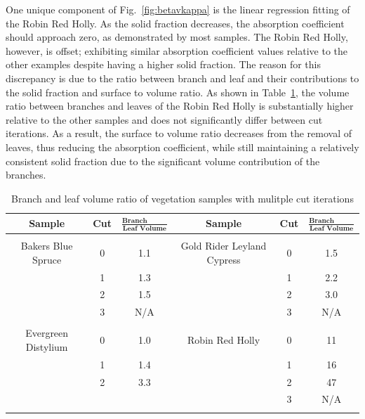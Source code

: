 \documentclass[12pt]{article}
\newcommand*\textfrac[2]{
  \frac{\textbf{#1}}{\textbf{#2}}
}
\begin{document}
One unique component of Fig.~\ref{fig:betavkappa} is the linear regression fitting of the Robin Red Holly. As the solid fraction decreases, the absorption coefficient should approach zero, as demonstrated by most samples. The Robin Red Holly, however, is offset; exhibiting similar absorption coefficient values relative to the other examples despite having a higher solid fraction. The reason for this discrepancy is due to the ratio between branch and leaf and their contributions to the solid fraction and surface to volume ratio. As shown in Table~\ref{tab:RatioTable}, the volume ratio between branches and leaves of the Robin Red Holly is substantially higher relative to the other samples and does not significantly differ between cut iterations. As a result, the surface to volume ratio decreases from the removal of leaves, thus reducing the absorption coefficient, while still maintaining a relatively consistent solid fraction due to the significant volume contribution of the branches.

\begin{table}[!]
\caption[Branch and leaf volume ratio of vegetation samples]{Branch and leaf volume ratio of vegetation samples with mulitple cut iterations}
\label{tab:RatioTable}
\centering
	
	\begin{tabular}{cccccc}	
			\hline
\rule{0pt}{14pt}\textbf{Sample}	&\textbf{Cut}	& ${\textfrac{Branch Volume}{Leaf Volume}}$ 	&\textbf{Sample}			&	\textbf{Cut}	& $\textfrac{Branch Volume}{Leaf Volume}$	\\
\hline
\\[0.01cm]
Bakers Blue Spruce			&	0		&        1.1							&Gold Rider Leyland Cypress	&	0		&	1.5						\\
					&	1		& 	1.3							&					&	1		&	2.2						\\
					&	2		& 	1.5							&					&	2		&	3.0						\\
					&	3		&	N/A							&					&	3		&  	N/A 						\\
					&			&								&					&			&       							\\
Evergreen Distylium			&	0		&	1.0							&Robin Red Holly			&	0		&	11						\\
					&	1		&	1.4							&					&	1		&	16						\\
					&	2		&	3.3							&					&	2		&	47						\\
					&			&								&					&	3		&        N/A 						\\
\\[0.005cm]
\hline														

\end{tabular}
\end{table}
\end{document}
